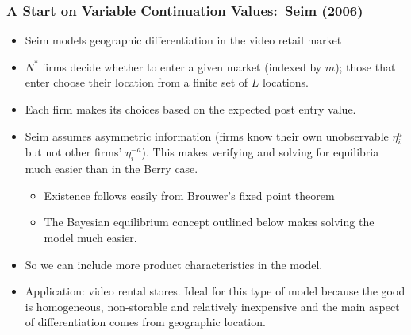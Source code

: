 \documentclass[notes=show]{beamer}
\begin{document}
\begin{frame}%

\frametitle{A Start on Variable Continuation Values:\ Seim (2006)}

\begin{itemize}
\item Seim models geographic differentiation in the video retail market

\item $N^{\ast }$ firms decide whether to enter a given market (indexed by $%
m $); those that enter choose their location from a finite set of $L$
locations.

\item Each firm makes its choices based on the expected post entry value.

\item Seim assumes asymmetric information (firms know their own unobservable 
$\eta _{i}^{a}$ but not other firms' $\eta _{i}^{-a}$). This makes verifying
and solving for equilibria much easier than in the Berry case.

\begin{itemize}
\item Existence follows easily from Brouwer's fixed point theorem

\item The Bayesian equilibrium concept outlined below makes solving the
model much easier.
\end{itemize}

\item So we can include more product characteristics in the model.

\item Application: video rental stores. Ideal for this type of model because
the good is homogeneous, non-storable and relatively inexpensive and the
main aspect of differentiation comes from geographic location.
\end{itemize}

\end{frame}%
\end{document}
